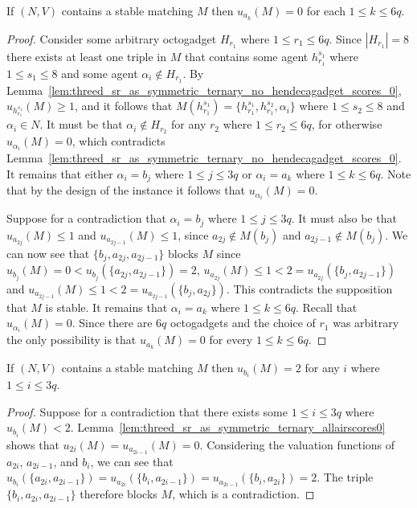 \begin{lem}
\label{lem:threed_sr_as_symmetric_ternary_allairscores0}
If $(N, V)$ contains a stable matching $M$ then $u_{a_k}(M)=0$ for each $1\leq k\leq 6q$.
\end{lem}
\begin{proof}
Consider some arbitrary octogadget $H_{r_1}$ where $1\leq r_1 \leq 6q$. Since $|H_{r_1}|=8$ there exists at least one triple in $M$ that contains some agent $h_{r_1}^{s_1}$ where $1\leq s_1 \leq 8$ and some agent $\alpha_i \notin H_{r_1}$. By Lemma~\ref{lem:threed_sr_as_symmetric_ternary_no_hendecagadget_scores_0}, $u_{h_{r_1}^{s_1}}(M)\geq 1$, and it follows that $M(h_{r_1}^{s_1})=\{ h_{r_1}^{s_1}, h_{r_1}^{s_2}, \alpha_i \}$ where $1\leq s_2 \leq 8$ and $\alpha_i \in N$. It must be that $\alpha_i \notin H_{r_2}$ for any $r_2$ where $1\leq r_2 \leq 6q$, for otherwise $u_{\alpha_i}(M)=0$, which contradicts Lemma~\ref{lem:threed_sr_as_symmetric_ternary_no_hendecagadget_scores_0}. It remains that either $\alpha_i = b_j$ where $1\leq j \leq 3q$ or $\alpha_i = a_{k}$ where $1\leq k\leq 6q$. Note that by the design of the instance it follows that $u_{\alpha_i}(M)=0$.

Suppose for a contradiction that $\alpha_i = b_j$ where $1\leq j \leq 3q$. It must also be that $u_{a_{2j}}(M) \leq 1$ and $u_{a_{2j-1}}(M) \leq 1$, since $a_{2j} \notin M(b_j)$ and $a_{2j-1} \notin M(b_j)$. We can now see that $\{ b_j, a_{2j}, a_{2j-1} \}$ blocks $M$ since $u_{b_j}(M) = 0 < u_{b_j}(\{ a_{2j}, a_{2j-1} \}) = 2$, $u_{a_{2j}}(M) \leq 1 < 2 = u_{a_{2j}}(\{ b_{j}, a_{2j-1} \})$ and $u_{a_{2j-1}}(M) \leq 1 < 2 = u_{a_{2j-1}}(\{ b_{j}, a_{2j} \})$. This contradicts the supposition that $M$ is stable. It remains that $\alpha_i = a_{k}$ where $1\leq k\leq 6q$. Recall that $u_{\alpha_i}(M)=0$. Since there are $6q$ octogadgets and the choice of $r_1$ was arbitrary the only possibility is that $u_{a_k}(M)=0$ for every $1\leq k \leq 6q$.
\end{proof}

\begin{lem}
\label{lem:threed_sr_as_symmetric_ternary_allbiscores2}
If $(N, V)$ contains a stable matching $M$ then $u_{b_i}(M)=2$ for any $i$ where $1 \leq i \leq 3q$.
\end{lem}
\begin{proof}
Suppose for a contradiction that there exists some $1 \leq i \leq 3q$ where $u_{b_i}(M) < 2$. Lemma~\ref{lem:threed_sr_as_symmetric_ternary_allairscores0} shows that $u_{2i}(M) = u_{a_{2i-1}}(M) = 0$. Considering the valuation functions of $a_{2i}$, $a_{2i-1}$, and $b_i$, we can see that $u_{b_i}(\{ a_{2i}, a_{2i-1} \}) = u_{a_{2i}}(\{ b_i, a_{2i-1} \}) = u_{a_{2i-1}}(\{ b_i, a_{2i} \}) = 2$. The triple $\{ b_i, a_{2i}, a_{2i-1} \}$ therefore blocks $M$, which is a contradiction.
\end{proof}

